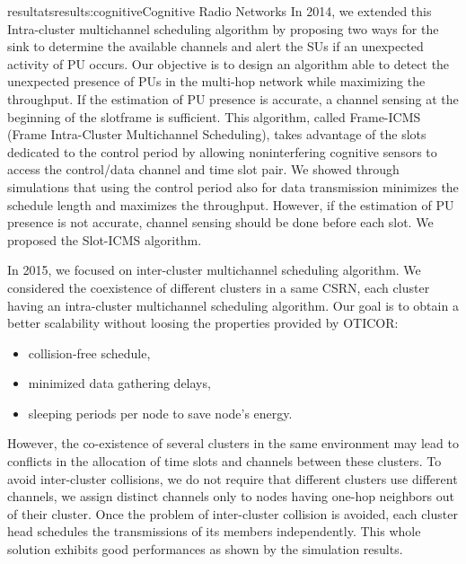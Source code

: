 \documentclass{ra2016}
\begin{document}
\begin{module}{resultats}{results:cognitive}{Cognitive Radio Networks}
In 2014, we extended this Intra-cluster multichannel scheduling algorithm by proposing two ways for the sink
to determine the available channels
and alert the SUs if an unexpected activity of PU occurs. Our
objective is to design an algorithm able to detect the unexpected
presence of PUs in the multi-hop network while maximizing
the throughput. If the estimation of PU presence is accurate, a channel sensing at the beginning of the slotframe is sufficient. This algorithm, called Frame-ICMS (Frame Intra-Cluster Multichannel Scheduling), takes advantage
of the slots dedicated to the control period by allowing noninterfering
cognitive sensors to access the control/data
channel and time slot pair. We showed through simulations that
using the control period also for data transmission minimizes the
schedule length and maximizes the throughput.
However, if the estimation of PU presence is not accurate, channel sensing should be done before each slot. We proposed the Slot-ICMS algorithm.

In 2015, we focused on inter-cluster multichannel scheduling algorithm. We considered the coexistence of different clusters in a same CSRN, each cluster having an intra-cluster multichannel scheduling algorithm. Our goal is to obtain a better scalability without loosing the properties provided by OTICOR:
\begin{itemize}
\item collision-free schedule,
\item minimized data gathering delays,
\item sleeping periods per node to save node's energy. 
\end{itemize}

However, the co-existence of several clusters in the same environment may lead to conflicts in the allocation of time slots and channels between these clusters.  To avoid inter-cluster collisions, we do not require that different clusters use different channels, we assign distinct channels only to nodes having one-hop neighbors out of their cluster. Once the problem of inter-cluster collision is avoided, each cluster head schedules the transmissions of its members independently.
This whole solution exhibits good performances as shown by the simulation results.

\end{module}
\end{document}
